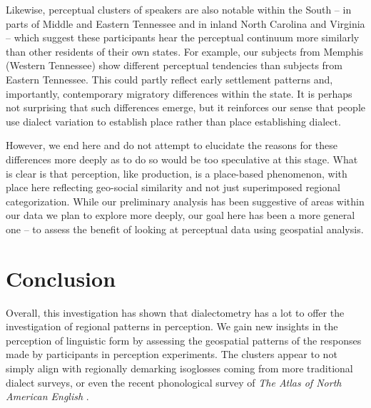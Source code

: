 \documentclass[output=paper]{LSP/langsci}
\begin{document}
Likewise, perceptual clusters of speakers are also notable within the South – in parts of Middle and Eastern Tennessee and in inland North Carolina and Virginia – which suggest these participants hear the perceptual continuum more similarly than other residents of their own states. For example, our subjects from Memphis (Western Tennessee) show different perceptual tendencies than subjects from Eastern Tennessee. This could partly reflect early settlement patterns and, importantly, contemporary migratory differences within the state. It is perhaps not surprising that such differences emerge, but it reinforces our sense that people use dialect variation to establish place rather than place establishing dialect.

However, we end here and do not attempt to elucidate the reasons for these differences more deeply as to do so would be too speculative at this stage. What is clear is that perception, like production, is a place-based phenomenon, with place here reflecting geo-social similarity and not just superimposed regional categorization. While our preliminary analysis has been suggestive of areas within our data we plan to explore more deeply, our goal here has been a more general one – to assess the benefit of looking at perceptual data using geospatial analysis.

\section{Conclusion}
Overall, this investigation has shown that dialectometry has a lot to offer the investigation of regional patterns in perception. We gain new insights in the perception of linguistic form by assessing the geospatial patterns of the responses made by participants in perception experiments. The clusters appear to not simply align with regionally demarking isoglosses coming from more traditional dialect surveys, or even the recent phonological survey of \textit{The Atlas of North American English} \citep{labov_atlas_2006-1}.
\end{document}
